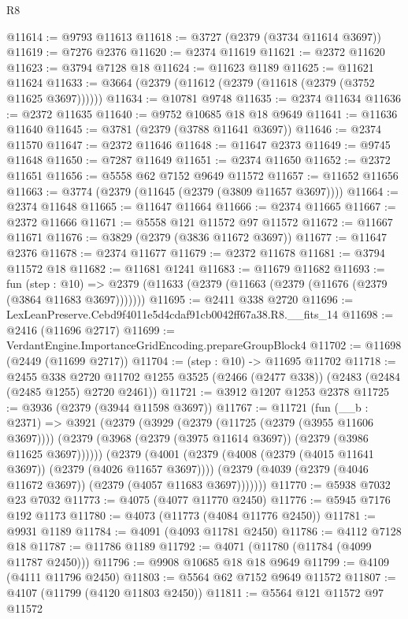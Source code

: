 \begin{lexlean}{R8}
\begin{coremodule}
@11614 := @9793 @11613
@11618 := @3727 (@2379 (@3734 @11614 @3697))
@11619 := @7276 @2376
@11620 := @2374 @11619
@11621 := @2372 @11620
@11623 := @3794 @7128 @18
@11624 := @11623 @1189
@11625 := @11621 @11624
@11633 := @3664 (@2379 (@11612 (@2379 (@11618 (@2379 (@3752 @11625 @3697))))))
@11634 := @10781 @9748
@11635 := @2374 @11634
@11636 := @2372 @11635
@11640 := @9752 @10685 @18 @18 @9649
@11641 := @11636 @11640
@11645 := @3781 (@2379 (@3788 @11641 @3697))
@11646 := @2374 @11570
@11647 := @2372 @11646
@11648 := @11647 @2373
@11649 := @9745 @11648
@11650 := @7287 @11649
@11651 := @2374 @11650
@11652 := @2372 @11651
@11656 := @5558 @62 @7152 @9649 @11572
@11657 := @11652 @11656
@11663 := @3774 (@2379 (@11645 (@2379 (@3809 @11657 @3697))))
@11664 := @2374 @11648
@11665 := @11647 @11664
@11666 := @2374 @11665
@11667 := @2372 @11666
@11671 := @5558 @121 @11572 @97 @11572
@11672 := @11667 @11671
@11676 := @3829 (@2379 (@3836 @11672 @3697))
@11677 := @11647 @2376
@11678 := @2374 @11677
@11679 := @2372 @11678
@11681 := @3794 @11572 @18
@11682 := @11681 @1241
@11683 := @11679 @11682
@11693 := fun (step : @10) =>
  @2379 (@11633 (@2379 (@11663 (@2379 (@11676 (@2379 (@3864 @11683 @3697)))))))
@11695 := @2411 @338 @2720
@11696 := LexLeanPreserve.Cebd9f4011e5d4cdaf91cb0042ff67a38.R8.__fits_14
@11698 := @2416 (@11696 @2717)
@11699 := VerdantEngine.ImportanceGridEncoding.prepareGroupBlock4
@11702 := @11698 (@2449 (@11699 @2717))
@11704 := (step : @10) -> @11695 @11702
@11718 := @2455
    @338
    @2720
    @11702
    @1255
    @3525
    (@2466 (@2477 @338))
    (@2483 (@2484 (@2485 @1255) @2720 @2461))
@11721 := @3912 @1207 @1253 @2378
@11725 := @3936 (@2379 (@3944 @11598 @3697))
@11767 := @11721
    (fun (__b : @2371) =>
    @3921
      (@2379
        (@3929
          (@2379 (@11725 (@2379 (@3955 @11606 @3697))))
          (@2379 (@3968 (@2379 (@3975 @11614 @3697)) (@2379 (@3986 @11625 @3697))))))
      (@2379
        (@4001
          (@2379 (@4008 (@2379 (@4015 @11641 @3697)) (@2379 (@4026 @11657 @3697))))
          (@2379 (@4039 (@2379 (@4046 @11672 @3697)) (@2379 (@4057 @11683 @3697)))))))
@11770 := @5938 @7032 @23 @7032
@11773 := @4075 (@4077 @11770 @2450)
@11776 := @5945 @7176 @192 @1173
@11780 := @4073 (@11773 (@4084 @11776 @2450))
@11781 := @9931 @1189
@11784 := @4091 (@4093 @11781 @2450)
@11786 := @4112 @7128 @18
@11787 := @11786 @1189
@11792 := @4071 (@11780 (@11784 (@4099 @11787 @2450)))
@11796 := @9908 @10685 @18 @18 @9649
@11799 := @4109 (@4111 @11796 @2450)
@11803 := @5564 @62 @7152 @9649 @11572
@11807 := @4107 (@11799 (@4120 @11803 @2450))
@11811 := @5564 @121 @11572 @97 @11572

\end{coremodule}
\end{lexlean}
